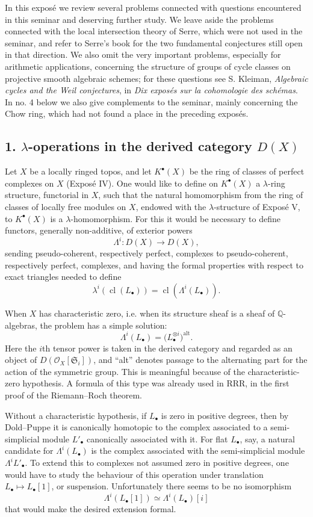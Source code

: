 \documentclass[12pt]{article}
\newcommand{\QQ}{\mathbb Q}
\newcommand{\cO}{\mathcal O}
\newcommand{\cl}{\operatorname{cl}}
\newcommand{\longto}{\longrightarrow}
\begin{document}
In this exposé we review several problems connected with questions encountered in this seminar and deserving further study. We leave aside the problems connected with the local intersection theory of Serre, which were not used in the seminar, and refer to Serre's book for the two fundamental conjectures still open in that direction. We also omit the very important problems, especially for arithmetic applications, concerning the structure of groups of cycle classes on projective smooth algebraic schemes; for these questions see S. Kleiman, \emph{Algebraic cycles and the Weil conjectures}, in \emph{Dix exposés sur la cohomologie des schémas}. In no. 4 below we also give complements to the seminar, mainly concerning the Chow ring, which had not found a place in the preceding exposés.

\subsection*{1. $\lambda$-operations in the derived category $D(X)$}

Let $X$ be a locally ringed topos, and let $K^\bullet(X)$ be the ring of classes of perfect complexes on $X$ (Exposé IV). One would like to define on $K^\bullet(X)$ a $\lambda$-ring structure, functorial in $X$, such that the natural homomorphism from the ring of classes of locally free modules on $X$, endowed with the $\lambda$-structure of Exposé V, to $K^\bullet(X)$ is a $\lambda$-homomorphism. For this it would be necessary to define functors, generally non-additive, of exterior powers
\[
\Lambda^i:D(X)\longto D(X),
\]
sending pseudo-coherent, respectively perfect, complexes to pseudo-coherent, respectively perfect, complexes, and having the formal properties with respect to exact triangles needed to define
\[
\lambda^i(\cl(L_\bullet))=\cl(\Lambda^i(L_\bullet)).
\tag{1.1}
\]

When $X$ has characteristic zero, i.e. when its structure sheaf is a sheaf of $\QQ$-algebras, the problem has a simple solution:
\[
\Lambda^i(L_\bullet)=\bigl(L_\bullet^{\otimes i}\bigr)^{\mathrm{alt}}.
\tag{1.2}
\]
Here the $i$th tensor power is taken in the derived category and regarded as an object of $D(\cO_X[\mathfrak S_i])$, and ``alt'' denotes passage to the alternating part for the action of the symmetric group. This is meaningful because of the characteristic-zero hypothesis. A formula of this type was already used in RRR, in the first proof of the Riemann--Roch theorem.

Without a characteristic hypothesis, if $L_\bullet$ is zero in positive degrees, then by Dold--Puppe it is canonically homotopic to the complex associated to a semi-simplicial module $L'_\bullet$ canonically associated with it. For flat $L_\bullet$, say, a natural candidate for $\Lambda^i(L_\bullet)$ is the complex associated with the semi-simplicial module $\Lambda^iL'_\bullet$. To extend this to complexes not assumed zero in positive degrees, one would have to study the behaviour of this operation under translation $L_\bullet\mapsto L_\bullet[1]$, or suspension. Unfortunately there seems to be no isomorphism
\[
\Lambda^i(L_\bullet[1])\simeq \Lambda^i(L_\bullet)[i]
\]
that would make the desired extension formal.
\end{document}
